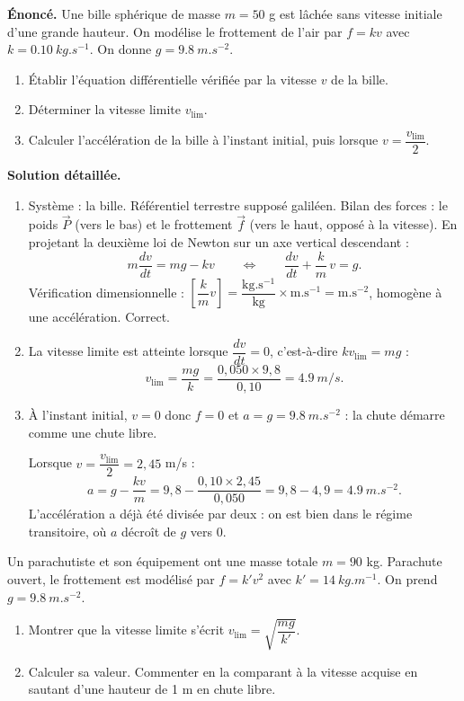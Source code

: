 \documentclass[11pt]{article}
\begin{document}
\begin{exoresolu}
\textbf{Énoncé.} Une bille sphérique de masse $m = 50$ g est lâchée sans vitesse initiale d'une grande hauteur. On modélise le frottement de l'air par $f = kv$ avec $k = \SI{0,10}{kg.s^{-1}}$. On donne $g = \SI{9,8}{m.s^{-2}}$.
\begin{enumerate}
\item Établir l'équation différentielle vérifiée par la vitesse $v$ de la bille.
\item Déterminer la vitesse limite $v_{\lim}$.
\item Calculer l'accélération de la bille à l'instant initial, puis lorsque $v = \dfrac{v_{\lim}}{2}$.
\end{enumerate}
\tcblower
\textbf{Solution détaillée.}
\begin{enumerate}
\item Système : la bille. Référentiel terrestre supposé galiléen. Bilan des forces : le poids $\vec{P}$ (vers le bas) et le frottement $\vec{f}$ (vers le haut, opposé à la vitesse). En projetant la deuxième loi de Newton sur un axe vertical descendant :
\[ m\dfrac{dv}{dt} = mg - kv \qquad \Longleftrightarrow \qquad \dfrac{dv}{dt} + \dfrac{k}{m}\,v = g. \]
Vérification dimensionnelle : $\left[\dfrac{k}{m}v\right] = \dfrac{\mathrm{kg.s^{-1}}}{\mathrm{kg}} \times \mathrm{m.s^{-1}} = \mathrm{m.s^{-2}}$, homogène à une accélération. Correct.
\item La vitesse limite est atteinte lorsque $\dfrac{dv}{dt} = 0$, c'est-à-dire $kv_{\lim} = mg$ :
\[ v_{\lim} = \dfrac{mg}{k} = \dfrac{0{,}050 \times 9{,}8}{0{,}10} = \SI{4,9}{m/s}. \]
\item À l'instant initial, $v = 0$ donc $f = 0$ et $a = g = \SI{9,8}{m.s^{-2}}$ : la chute démarre comme une chute libre.

Lorsque $v = \dfrac{v_{\lim}}{2} = 2{,}45$ m/s :
\[ a = g - \dfrac{kv}{m} = 9{,}8 - \dfrac{0{,}10 \times 2{,}45}{0{,}050} = 9{,}8 - 4{,}9 = \SI{4,9}{m.s^{-2}}. \]
L'accélération a déjà été divisée par deux : on est bien dans le régime transitoire, où $a$ décroît de $g$ vers $0$.
\end{enumerate}
\end{exoresolu}

\begin{exercice}
Un parachutiste et son équipement ont une masse totale $m = 90$ kg. Parachute ouvert, le frottement est modélisé par $f = k'v^2$ avec $k' = \SI{14}{kg.m^{-1}}$. On prend $g = \SI{9,8}{m.s^{-2}}$.
\begin{enumerate}
\item Montrer que la vitesse limite s'écrit $v_{\lim} = \sqrt{\dfrac{mg}{k'}}$.
\item Calculer sa valeur. Commenter en la comparant à la vitesse acquise en sautant d'une hauteur de 1 m en chute libre.
\end{enumerate}
\end{exercice}
\end{document}
